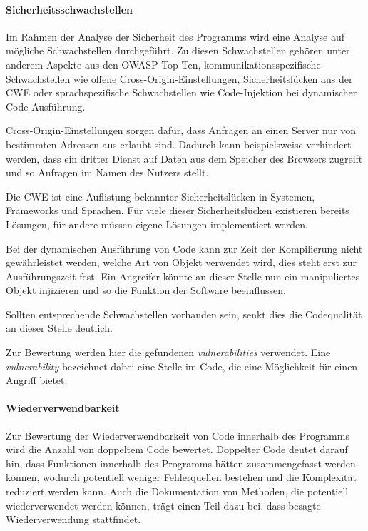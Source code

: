 \documentclass[
	oneside,  %
	ngerman, 
	final, 
	11pt, 
	a4paper, 
	1.1headlines, 
	headinclude=false, 
	footinclude=false, 
	mpinclude=false, 
	pagesize, 
	onecolumn, 
	titlepage, 
	parskip=half, 
	headsepline, 
	chapterprefix=false, 
	version=first, 
	listof=totoc, 
	bibliography=totoc, 
	toc=graduated, 
	fleqn
]{scrbook}
\begin{document}
\paragraph{Sicherheitsschwachstellen}
Im Rahmen der Analyse der Sicherheit des Programms wird eine Analyse auf mögliche Schwachstellen durchgeführt.
Zu diesen Schwachstellen gehören unter anderem Aspekte aus den \acs{OWASP}-Top-Ten, kommunikationsspezifische Schwachstellen wie offene Cross-Origin-Einstellungen, Sicherheitslücken aus der \acf{CWE} oder sprachspezifische Schwachstellen wie Code-Injektion bei dynamischer Code-Ausführung.

Cross-Origin-Einstellungen sorgen dafür, dass Anfragen an einen Server nur von bestimmten Adressen aus erlaubt sind.
Dadurch kann beispielsweise verhindert werden, dass ein dritter Dienst auf Daten aus dem Speicher des Browsers zugreift und so Anfragen im Namen des Nutzers stellt.

Die \acs{CWE} ist eine Auflistung bekannter Sicherheitslücken in Systemen, Frameworks und Sprachen.
Für viele dieser Sicherheitslücken existieren bereits Lösungen, für andere müssen eigene Lösungen implementiert werden.

Bei der dynamischen Ausführung von Code kann zur Zeit der Kompilierung nicht gewährleistet werden, welche Art von Objekt verwendet wird, dies steht erst zur Ausführungszeit fest.
Ein Angreifer könnte an dieser Stelle nun ein manipuliertes Objekt injizieren und so die Funktion der Software beeinflussen.

Sollten entsprechende Schwachstellen vorhanden sein, senkt dies die Codequalität an dieser Stelle deutlich.

Zur Bewertung werden hier die gefundenen \textit{vulnerabilities} verwendet.
Eine \textit{vulnerability} bezeichnet dabei eine Stelle im Code, die eine Möglichkeit für einen Angriff bietet.

\paragraph{Wiederverwendbarkeit}
Zur Bewertung der Wiederverwendbarkeit von Code innerhalb des Programms wird die Anzahl von doppeltem Code bewertet.
Doppelter Code deutet darauf hin, dass Funktionen innerhalb des Programms hätten zusammengefasst werden können, wodurch potentiell weniger Fehlerquellen bestehen und die Komplexität reduziert werden kann.
Auch die Dokumentation von Methoden, die potentiell wiederverwendet werden können, trägt einen Teil dazu bei, dass besagte Wiederverwendung stattfindet.
\end{document}
